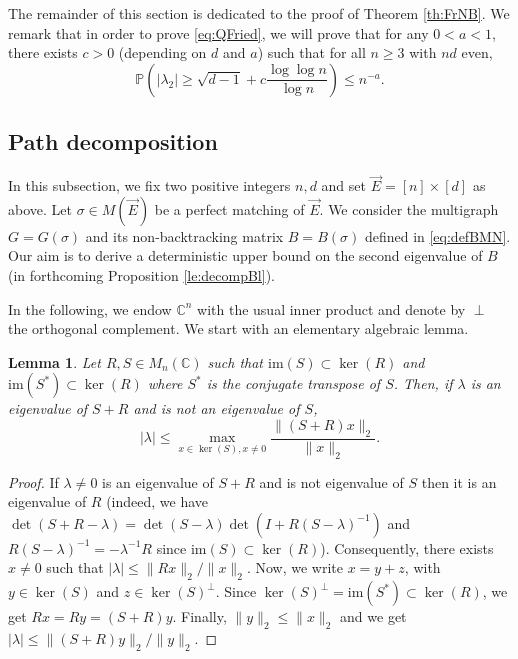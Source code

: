 \documentclass[11pt]{article}
\newtheorem{lemma}{Lemma}
\newcommand{\dP}{\mathbb{P}}
\newcommand{\dC}{\mathbb {C}}
\newcommand{\PAR}[1]{{{\left(#1\right)}}} %
\newcommand{\1}{1\!\!{\sf I}}\newcommand{\IND}{\1}
\begin{document}
The remainder of this section is dedicated to the proof of Theorem \ref{th:FrNB}. We remark that in order to prove \eqref{eq:QFried}, we will prove that for any $0 < a < 1$, there exists $c>0$ (depending on $d$ and $a$) such that for all $n \geq 3$ with $nd$ even,
\begin{equation}\label{eq:QFriedB}
\dP \PAR{  |\lambda_2| \geq  \sqrt{d-1} +c\frac{\log \log n }{ \log n}} \leq  n^{-a}.  
\end{equation}


\subsection{Path decomposition}
\label{subsec:PD}

In this subsection, we fix two positive integers $n,d$ and set $\vec E = [n] \times [d]$ as above. Let $\sigma \in M(\vec E)$ be a perfect matching of $\vec E$. We consider the multigraph $G = G(\sigma)$ and its non-backtracking matrix $B = B(\sigma)$ defined in \eqref{eq:defBMN}. Our aim is to derive a deterministic upper bound on  the second eigenvalue of $B$ (in forthcoming Proposition \ref{le:decompBl}). 



In the following, we endow $\dC^n$ with the usual inner product and denote by $\perp$ the orthogonal complement. We start with an elementary algebraic lemma.  
\begin{lemma}\label{le:HR}
Let $R, S \in M_n (\dC)$ such that  $\mathrm{im}( S ) \subset \ker (R)$ and $\mathrm{im}(S^*) \subset \ker (R)$ where $S^*$ is the conjugate transpose of $S$. Then, if $\lambda$ is an eigenvalue of $S +R$ and is not an eigenvalue of $S$,
$$
|\lambda| \leq  \max_{x \in \ker (S), x \ne 0} \frac{\|(S + R)x\|_2}{\|x \|_2}.
$$
\end{lemma}

\begin{proof}
If $\lambda \ne 0$ is an eigenvalue of $S+R$ and is not eigenvalue of $S$ then it is an eigenvalue of $R$ (indeed, we have $\det ( S + R - \lambda )  = \det ( S - \lambda) \det ( I +  R (S - \lambda)^{-1} )$  and $R (S- \lambda)^{-1} = -  \lambda^{-1} R $ since $\mathrm{im}( S ) \subset \ker (R)$). Consequently, there exists $x \ne 0$ such that $|\lambda| \leq \| R x \|_2 / \|x \|_2$. Now, we write $x  = y + z$, with $y \in \ker (S)$ and $z \in  \ker (S)^\perp$. Since $\ker (S)^\perp =  \mathrm{im}(S^*)  \subset \ker (R)$, we get $ R x =  R y   = (S + R)y$.  Finally, $\|y \|_2  \leq \|x\|_2$ and we get $|\lambda| \leq \|  (S+ R) y  \|_2 / \| y \|_2$. 
\end{proof}
\end{document}
